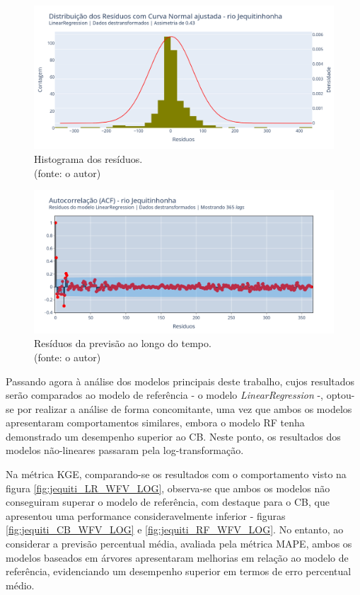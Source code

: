\begin{figure}[!h]
	\centering
	\includegraphics[scale=0.33]{Figuras/jequiti/wfv/LR/LR_WFV_LOG_RESID_x_CURVA_NORMAL.png}
	\caption{Histograma dos resíduos.\\(fonte: o autor)}
	\label{fig:jequiti_LR_WFV_LOG_RESID_x_CURVA_NORMAL}
\end{figure}

\begin{figure}[!h]
	\centering
	\includegraphics[scale=0.33]{Figuras/jequiti/wfv/LR/LR_WFV_LOG_RESID_ACF.png}
	\caption{Resíduos da previsão ao longo do tempo.\\(fonte: o autor)}
	\label{fig:jequiti_LR_WFV_LOG_RESID_ACF}
\end{figure}
\clearpage

Passando agora à análise dos modelos principais deste trabalho, cujos resultados serão comparados ao modelo de referência - o modelo \textit{LinearRegression} -, optou-se por realizar a análise de forma concomitante, uma vez que ambos os modelos apresentaram comportamentos similares, embora o modelo RF tenha demonstrado um desempenho superior ao CB. Neste ponto, os resultados dos modelos não-lineares passaram pela log-transformação.

Na métrica KGE, comparando-se os resultados com o comportamento visto na figura \ref{fig:jequiti_LR_WFV_LOG}, observa-se que ambos os modelos não conseguiram superar o modelo de referência, com destaque para o CB, que apresentou uma performance consideravelmente inferior - figuras \ref{fig:jequiti_CB_WFV_LOG} e \ref{fig:jequiti_RF_WFV_LOG}. No entanto, ao considerar a previsão percentual média, avaliada pela métrica MAPE, ambos os modelos baseados em árvores apresentaram melhorias em relação ao modelo de referência, evidenciando um desempenho superior em termos de erro percentual médio.

